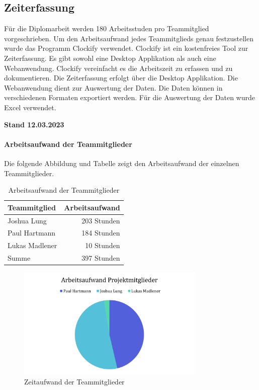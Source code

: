 \subsection{Zeiterfassung}
Für die Diplomarbeit werden 180 Arbeitsstuden pro Teammitglied vorgeschrieben. Um den Arbeitsaufwand jedes Teammitglieds genau festzustellen wurde das Programm Clockify verwendet. Clockify ist ein kostenfreies Tool zur Zeiterfassung. Es gibt sowohl eine Desktop Applikation als auch eine Webanwendung. Clockify vereinfacht es die Arbeitszeit zu erfassen und zu dokumentieren. Die Zeiterfassung erfolgt über die Desktop Applikation. Die Webanwendung dient zur Auswertung der Daten. Die Daten können in verschiedenen Formaten exportiert werden. Für die Auswertung der Daten wurde Excel verwendet.

\textbf{Stand 12.03.2023}

\paragraph{Arbeitsaufwand der Teammitglieder}
Die folgende Abbildung und Tabelle zeigt den Arbeitsaufwand der einzelnen Teammitglieder.

\begin{table}[H]
  \centering
  \begin{tabular}{lr}
    \toprule
    \textbf{Teammitglied} & \textbf{Arbeitsaufwand} \\
    \midrule
    Joshua Lung           & 203 Stunden             \\
    Paul Hartmann         & 184 Stunden             \\
    Lukas Madlener        & 10 Stunden              \\
    \midrule
    Summe                 & 397 Stunden             \\
    \bottomrule
  \end{tabular}
  \caption{Arbeitsaufwand der Teammitglieder}
  \label{tab:zeiterfassung_teammitglieder}
\end{table}

\begin{figure}[H]
  \centering
  \includegraphics[width=0.8\textwidth]{images/zeiterfassung_teammitglieder.png}
  \caption{Zeitaufwand der Teammitglieder}
  \label{fig:zeiterfassung_teammitglieder}
\end{figure}


